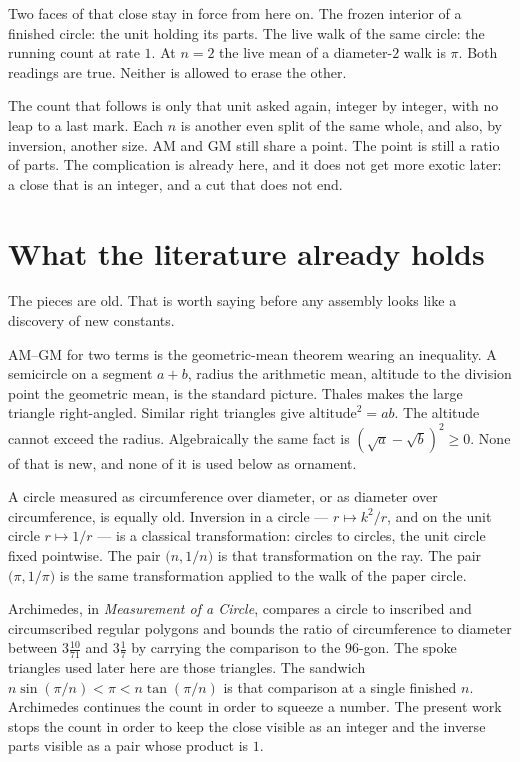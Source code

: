 \documentclass[10pt,a4paper]{article}
\theoremstyle{plain}
\theoremstyle{definition}
\theoremstyle{remark}
\begin{document}
Two faces of that close stay in force from here on.
The frozen interior of a finished circle: the unit holding its parts.
The live walk of the same circle: the running count at rate \(1\).
At \(n=2\) the live mean of a diameter-\(2\) walk is \(\pi\).
Both readings are true.
Neither is allowed to erase the other.

The count that follows is only that unit asked again, integer by integer, with no leap to a last mark.
Each \(n\) is another even split of the same whole, and also, by inversion, another size.
AM and GM still share a point.
The point is still a ratio of parts.
The complication is already here, and it does not get more exotic later: a close that is an integer, and a cut that does not end.

\section{What the literature already holds}

The pieces are old.
That is worth saying before any assembly looks like a discovery of new constants.

AM--GM for two terms is the geometric-mean theorem wearing an inequality.
A semicircle on a segment \(a+b\), radius the arithmetic mean, altitude to the division point the geometric mean, is the standard picture.
Thales makes the large triangle right-angled.
Similar right triangles give \(\text{altitude}^{2}=ab\).
The altitude cannot exceed the radius.
Algebraically the same fact is \((\sqrt{a}-\sqrt{b})^{2}\ge 0\).
None of that is new, and none of it is used below as ornament.

A circle measured as circumference over diameter, or as diameter over circumference, is equally old.
Inversion in a circle --- \(r\mapsto k^{2}/r\), and on the unit circle \(r\mapsto 1/r\) --- is a classical transformation: circles to circles, the unit circle fixed pointwise.
The pair \(\bigl(n,1/n\bigr)\) is that transformation on the ray.
The pair \(\bigl(\pi,1/\pi\bigr)\) is the same transformation applied to the walk of the paper circle.

Archimedes, in \emph{Measurement of a Circle}, compares a circle to inscribed and circumscribed regular polygons and bounds the ratio of circumference to diameter between \(3\tfrac{10}{71}\) and \(3\tfrac{1}{7}\) by carrying the comparison to the \(96\)-gon.
The spoke triangles used later here are those triangles.
The sandwich \(n\sin(\pi/n)<\pi<n\tan(\pi/n)\) is that comparison at a single finished \(n\).
Archimedes continues the count in order to squeeze a number.
The present work stops the count in order to keep the close visible as an integer and the inverse parts visible as a pair whose product is \(1\).
\end{document}
